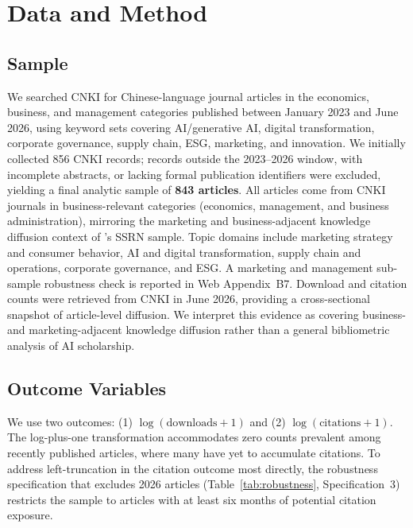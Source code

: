 \documentclass[12pt,a4paper]{article}
\begin{document}
\section{Data and Method}
\label{sec:method}

\subsection{Sample}

We searched CNKI for Chinese-language journal articles in the
economics, business, and management categories published between
January 2023 and June 2026, using keyword sets covering
AI/generative AI, digital transformation, corporate governance,
supply chain, ESG, marketing, and innovation.
We initially collected 856 CNKI records; records outside the 2023--2026
window, with incomplete abstracts, or lacking formal publication
identifiers were excluded, yielding a final analytic sample of
\textbf{843 articles}.
All articles come from CNKI journals in business-relevant categories
(economics, management, and business administration), mirroring the
marketing and business-adjacent knowledge diffusion context of
\citet{JoLi2026}'s SSRN sample.
Topic domains include marketing strategy and consumer behavior,
AI and digital transformation, supply chain and operations, corporate
governance, and ESG.
A marketing and management sub-sample robustness check is reported in
Web Appendix~B7.
Download and citation counts were retrieved from CNKI in June 2026,
providing a cross-sectional snapshot of article-level diffusion.
We interpret this evidence as covering business- and
marketing-adjacent knowledge diffusion rather than a general
bibliometric analysis of AI scholarship.

\subsection{Outcome Variables}

We use two outcomes: (1) $\log(\text{downloads}+1)$ and
(2) $\log(\text{citations}+1)$.
The log-plus-one transformation accommodates zero counts prevalent
among recently published articles, where many have yet to accumulate
citations.
To address left-truncation in the citation outcome most directly,
the robustness specification that excludes 2026 articles
(Table~\ref{tab:robustness}, Specification~3) restricts the sample
to articles with at least six months of potential citation exposure.
\end{document}
